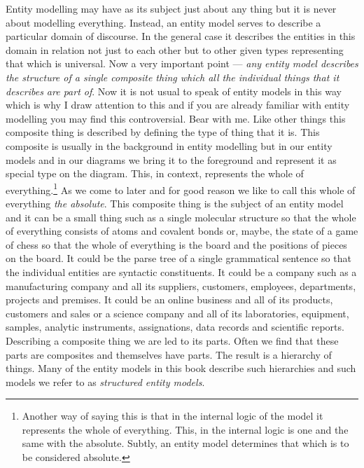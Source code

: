 \mynote Entity modelling may have as its subject just about any thing but it is never about modelling everything.
Instead, an entity model serves to describe a particular domain of discourse. In the general case it describes the entities in this domain in relation not just to each other but to other given types representing that which is universal. 
\mynote
Now a very  important point ---
\textit{any entity model describes the structure of a single composite thing which all the individual things that it describes are part of}. Now it is not usual to speak of entity models in this way which is why I draw attention to this and if you are already familiar with entity modelling you may find this controversial. Bear with me.
\mynote
Like other things this composite thing is described by defining the type of thing that it is. This composite is usually in the background in entity modelling but in our entity models and in our diagrams we bring it to the foreground and represent it as special type on the diagram. 
This, in context, represents the whole of everything.\footnote{Another way of saying this is that in the internal logic of the model it represents the whole of everything. This, in the internal logic is one and the same with the absolute. Subtly, an entity model determines that which is to be considered absolute.} As we come to later and for good reason we like to call this whole of everything \textit{the absolute}.   This composite thing  is the subject of an entity model and it can be a small thing such as a single molecular structure so that the whole of everything consists of atoms and covalent bonds or, maybe, the state of a game of chess so that the whole of everything is the board and the positions of pieces on the board. It could be the parse tree of a single grammatical sentence 
so that the individual entities are syntactic constituents. 
It could be a company such as a manufacturing company and all its suppliers, customers, employees, departments, projects and premises. 
It could be an online business and all of its products, customers and sales or
a science company and all of its laboratories, equipment, samples, analytic instruments, assignations, data records and  scientific reports. 
\mynote
Describing a composite thing we are led to its parts. Often we find that these parts are composites and themselves have parts. The result is a hierarchy of things. Many of the  entity models in this book describe such hierarchies and such models we refer to as  \textit{structured entity models}.

